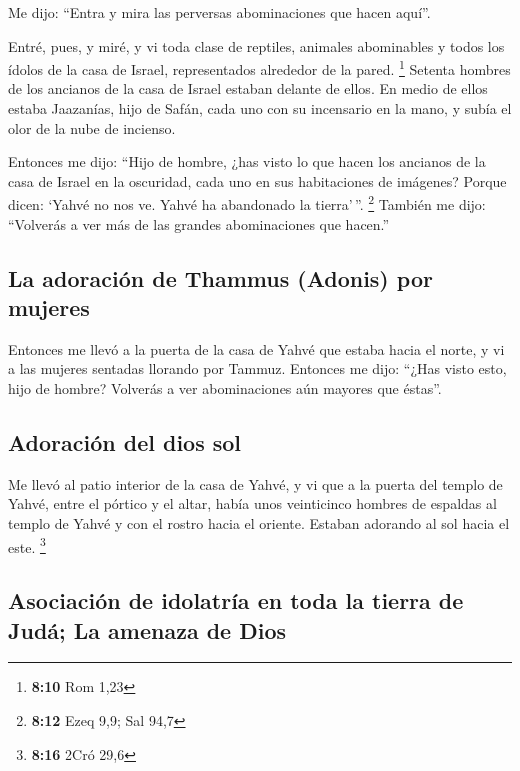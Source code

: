 \begin{paracol}{2}
 Me dijo: ``Entra y mira las perversas abominaciones que
hacen aquí''.

 Entré, pues, y miré, y vi toda clase de reptiles,
animales abominables y todos los ídolos de la casa de Israel,
representados alrededor de la pared. \footnote{\textbf{8:10} Rom 1,23}
 Setenta hombres de los ancianos de la casa de Israel
estaban delante de ellos. En medio de ellos estaba Jaazanías, hijo de
Safán, cada uno con su incensario en la mano, y subía el olor de la nube
de incienso.

 Entonces me dijo: ``Hijo de hombre, ¿has visto lo que
hacen los ancianos de la casa de Israel en la oscuridad, cada uno en sus
habitaciones de imágenes? Porque dicen: `Yahvé no nos ve. Yahvé ha
abandonado la tierra'\,''. \footnote{\textbf{8:12} Ezeq 9,9; Sal 94,7}
 También me dijo: ``Volverás a ver más de las grandes
abominaciones que hacen.''

\hypertarget{la-adoraciuxf3n-de-thammus-adonis-por-mujeres}{%
\subsection{La adoración de Thammus (Adonis) por
mujeres}\label{la-adoraciuxf3n-de-thammus-adonis-por-mujeres}}

 Entonces me llevó a la puerta de la casa de Yahvé que
estaba hacia el norte, y vi a las mujeres sentadas llorando por Tammuz.
 Entonces me dijo: ``¿Has visto esto, hijo de hombre?
Volverás a ver abominaciones aún mayores que éstas''.

\hypertarget{adoraciuxf3n-del-dios-sol}{%
\subsection{Adoración del dios sol}\label{adoraciuxf3n-del-dios-sol}}

 Me llevó al patio interior de la casa de Yahvé, y vi que
a la puerta del templo de Yahvé, entre el pórtico y el altar, había unos
veinticinco hombres de espaldas al templo de Yahvé y con el rostro hacia
el oriente. Estaban adorando al sol hacia el este. \footnote{\textbf{8:16}
  2Cró 29,6}

\hypertarget{asociaciuxf3n-de-idolatruxeda-en-toda-la-tierra-de-juduxe1-la-amenaza-de-dios}{%
\subsection{Asociación de idolatría en toda la tierra de Judá; La
amenaza de
Dios}\label{asociaciuxf3n-de-idolatruxeda-en-toda-la-tierra-de-juduxe1-la-amenaza-de-dios}}


\end{paracol}
